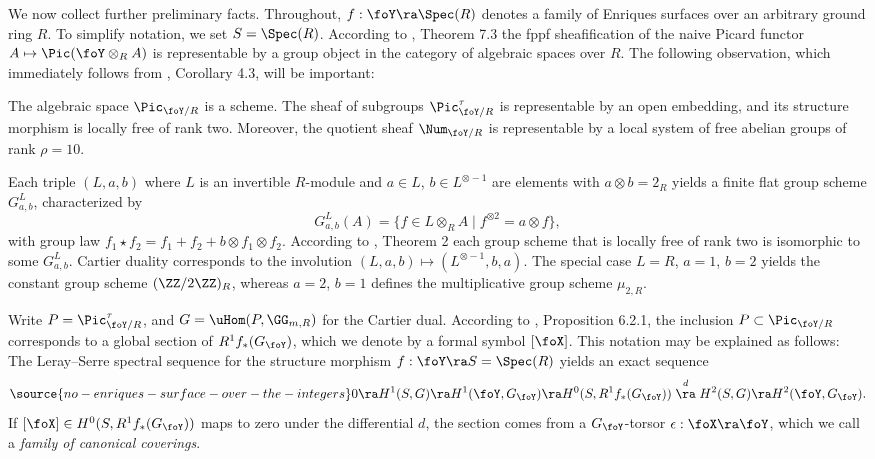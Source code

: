 We now collect further preliminary facts.
Throughout, $f:\foY\ra \Spec(R)$ denotes a family of Enriques surfaces over an arbitrary ground ring $R$.
To simplify notation, we set $S=\Spec(R)$.
According to \cite{Artin-1969}, Theorem 7.3
the fppf sheafification of the naive Picard functor $A\mapsto\Pic(\foY\otimes_RA)$ is representable by a
group object in the category of algebraic spaces over $R$.
The following observation, which immediately follows from \cite{Ekedahl-Hyland-Shepherd-Barron-2012}, Corollary 4.3,
will be important:

\begin{proposition}
\notready
The algebraic space $\Pic_{\foY/R}$ is a scheme.
The sheaf of subgroups $\Pic^\tau_{\foY/R}$ is representable by an open embedding,
and its structure morphism  is  locally free of rank  two.
Moreover, the     quotient sheaf $\Num_{\foY/R}$ is representable by a local system of free abelian groups of rank $\rho=10$.
\end{proposition}

Each triple $(L,a,b)$ where $L$ is an invertible $R$-module and $a\in L$, $b\in L^{\otimes -1}$ are
elements with $a\otimes b=2_R$ yields a finite flat group scheme $G^L_{a,b}$, characterized by
$$
G^L_{a,b}(A)=\{f\in L\otimes_RA\mid f^{\otimes 2}=a\otimes f \},
$$
with group law $f_1\star f_2=f_1+f_2+ b\otimes  f_1\otimes   f_2$.
According to \cite{Tate-Oort-1970}, Theorem 2 each
group scheme that is locally free of rank two is isomorphic to some $G^L_{a,b}$. Cartier duality corresponds
to the involution $(L,a,b)\mapsto (L^{\otimes -1},b,a)$.
The special case $L=R$, $a=1$, $b=2$ yields the constant group scheme $(\ZZ/2\ZZ)_R$,
whereas $a=2$, $b=1$ defines the multiplicative group scheme $\mu_{2,R}$.

Write $P=\Pic^\tau_{\foY/R}$,   and   $G=\uHom(P,\GG_{m,R})$ for the Cartier dual.
According to \cite{Raynaud-1970}, Proposition 6.2.1, the inclusion $P\subset\Pic_{\foY/R}$ corresponds to a global section
of $R^1f_*(G_\foY)$, which we denote by a formal symbol $[\foX]$. This  notation may  be explained as follows:
 The Leray--Serre spectral sequence for the structure morphism $f:\foY\ra S=\Spec(R)$
yields an exact sequence
\begin{equation}
\label{5-term sequence}
\source{no-enriques-surface-over-the-integers}
0\ra H^1(S, G)\ra H^1(\foY,G_\foY)\ra H^0(S,R^1f_*(G_\foY))\stackrel{d}{\ra} H^2(S,G)\ra H^2(\foY,G_\foY).
\end{equation}
If $[\foX]\in H^0(S,R^1f_*(G_\foY))$ maps to zero under the differential $d$, the section comes
from a $G_\foY$-torsor $\epsilon:\foX\ra \foY$, which we call a \emph{family of canonical coverings}.

